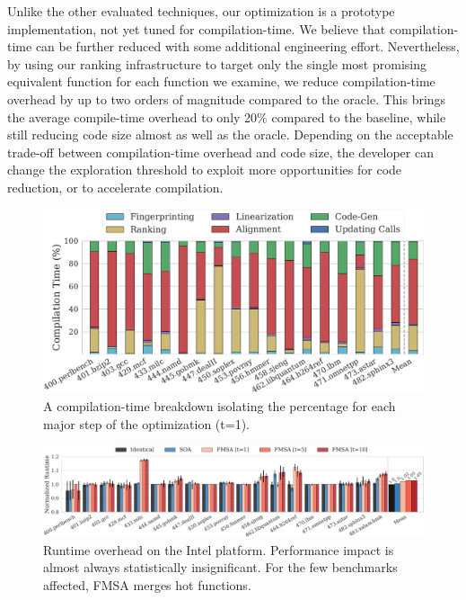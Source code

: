 Unlike the other evaluated techniques, our optimization is a prototype implementation, not yet tuned for compilation-time. We believe that
compilation-time can be further reduced with some additional engineering effort. Nevertheless, by using our ranking infrastructure to
target only the single most promising equivalent function for each function we examine, we reduce compilation-time overhead by up to two
orders of magnitude compared to the oracle. This brings the average compile-time overhead to only 20\% compared to the baseline, while
still reducing code size almost as well as the oracle. Depending on the acceptable trade-off between compilation-time overhead and code
size, the developer can change the exploration threshold to exploit more opportunities for code reduction, or to accelerate compilation.

\begin{figure}[t]
  \centering
  \includegraphics[width=1.0\linewidth]{figs/compilation-time-breakdown-sqrd.pdf}
  \caption{A compilation-time breakdown isolating the percentage for each major
           step of the optimization (t=1).}%
  \label{fig:compilation-time-breakdown}
\end{figure}

\begin{figure}[t]
  \centering
  \includegraphics[width=\linewidth]{figs/runtime-impact.pdf}
  \caption{Runtime overhead on the Intel platform. Performance impact is almost always statistically insignificant. For the few benchmarks affected, FMSA merges hot functions.}
  \label{fig:runtime-impact}
\end{figure}

